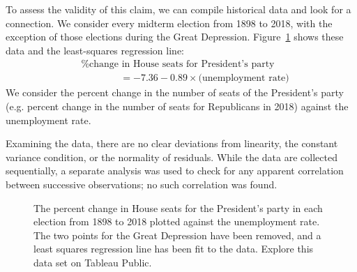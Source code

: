 To assess the validity of this claim, we can compile historical data and look for a connection. We consider every midterm election from 1898 to 2018, with the exception of those elections during the Great Depression. Figure~\ref{unemploymentAndChangeInHouse} shows these data and the least-squares regression line: \vspace{-2mm}
\begin{align*}
&\text{\% change in House seats for President's party}  \\
&\qquad\qquad= -7.36 - 0.89\times \text{(unemployment rate)}
\end{align*}
We consider the percent change in the number of seats of the President's party (e.g. percent change in the number of seats for Republicans in 2018) against the unemployment rate.

Examining the data, there are no clear deviations from linearity, the constant variance condition, or the normality of residuals. While the data are collected sequentially, a separate analysis was used to check for any apparent correlation between successive observations; no such correlation was found.

\begin{figure}[h]
\centering
{}
\caption{The percent change in House seats for the President's party in each election from 1898 to 2018 plotted against the unemployment rate. The two points for the Great Depression have been removed, and a least squares regression line has been fit to the data.  Explore this data set on Tableau Public.}
\label{unemploymentAndChangeInHouse}
\end{figure}

